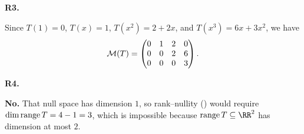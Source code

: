 \documentclass[10pt]{scrartcl}
\begin{document}
\begin{prob}\textbf{R3.}\par{}
Since $T(1)=0$, $T(x)=1$, $T(x^2)=2+2x$, and $T(x^3)=6x+3x^2$, we have
\[
  \mathcal M(T) = \begin{pmatrix} 0 & 1 & 2 & 0 \\ 0 & 0 & 2 & 6 \\ 0 & 0 & 0 & 3 \end{pmatrix}.
\]
\end{prob}

\begin{prob}\textbf{R4.}\par{}
\textbf{No.} That null space has dimension $1$, so rank--nullity () would require $\dim\operatorname{range} T=4-1=3$, which is impossible because $\range T\subseteq\RR^2$ has dimension at most $2$.
\end{prob}
\end{document}
